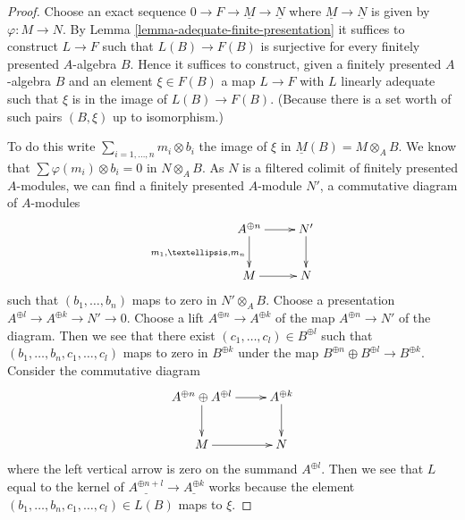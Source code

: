 \documentclass{stacks-project}
\theoremstyle{plain}
\theoremstyle{definition}
\theoremstyle{remark}
\numberwithin{equation}{subsection}
\begin{document}
\begin{proof}
Choose an exact sequence $0 \to F \to \underline{M} \to \underline{N}$
where $\underline{M} \to \underline{N}$ is given by
$\varphi : M \to N$. By
Lemma \ref{lemma-adequate-finite-presentation}
it suffices to construct $L \to F$ such that $L(B) \to F(B)$ is surjective
for every finitely presented $A$-algebra $B$. Hence it suffices to construct,
given a finitely presented $A$-algebra $B$ and an element $\xi \in F(B)$
a map $L \to F$ with $L$ linearly adequate such that $\xi$ is in the image
of $L(B) \to F(B)$.
(Because there is a set worth of such pairs $(B, \xi)$ up to isomorphism.)

\medskip\noindent
To do this write $\sum_{i = 1, \ldots, n} m_i \otimes b_i$ the image of
$\xi$ in $\underline{M}(B) = M \otimes_A B$. We know that
$\sum \varphi(m_i) \otimes b_i = 0$ in $N \otimes_A B$.
As $N$ is a filtered colimit of finitely presented $A$-modules, we can
find a finitely presented $A$-module $N'$, a commutative diagram
of $A$-modules
$$
\xymatrix{
A^{\oplus n} \ar[r] \ar[d]_{m_1, \ldots, m_n} & N' \ar[d] \\
M \ar[r] & N
}
$$
such that $(b_1, \ldots, b_n)$ maps to zero in $N' \otimes_A B$.
Choose a presentation $A^{\oplus l} \to A^{\oplus k} \to N' \to 0$.
Choose a lift $A^{\oplus n} \to A^{\oplus k}$ of the map
$A^{\oplus n} \to N'$ of the diagram. Then we see that there exist
$(c_1, \ldots, c_l) \in B^{\oplus l}$ such that
$(b_1, \ldots, b_n, c_1, \ldots, c_l)$ maps to zero in $B^{\oplus k}$
under the map $B^{\oplus n} \oplus B^{\oplus l} \to B^{\oplus k}$.
Consider the commutative diagram
$$
\xymatrix{
A^{\oplus n} \oplus A^{\oplus l} \ar[r] \ar[d] & A^{\oplus k} \ar[d] \\
M \ar[r] & N
}
$$
where the left vertical arrow is zero on the summand $A^{\oplus l}$.
Then we see that $L$ equal to the kernel of $\underline{A^{\oplus n + l}}
\to \underline{A^{\oplus k}}$ works because the element
$(b_1, \ldots, b_n, c_1, \ldots, c_l) \in L(B)$ maps to $\xi$.
\end{proof}
\end{document}
